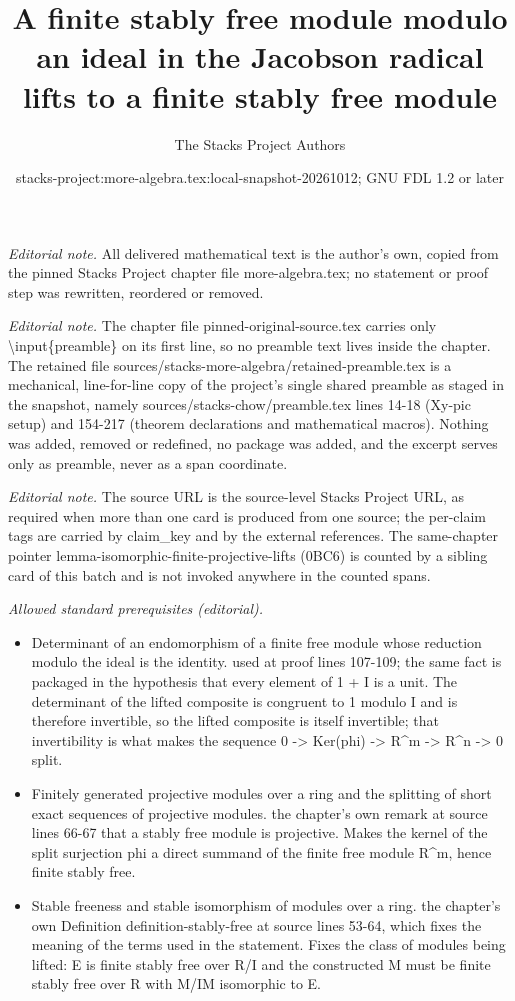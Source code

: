 \documentclass[10pt,a4paper]{amsart}
\title{A finite stably free module modulo an ideal in the Jacobson radical lifts to a finite stably free module}
\author{The Stacks Project Authors}
\date{stacks-project:more-algebra.tex:local-snapshot-20261012; GNU FDL 1.2 or later}
\theoremstyle{plain}
\theoremstyle{definition}
\theoremstyle{remark}
\numberwithin{equation}{subsection}
\begin{document}
\maketitle
\setcounter{subsection}{1}
\noindent\textit{Editorial note.} All delivered mathematical text is the author's own, copied from the pinned Stacks Project chapter file more-algebra.tex; no statement or proof step was rewritten, reordered or removed.\par\medskip
\noindent\textit{Editorial note.} The chapter file pinned-original-source.tex carries only \textbackslash{}input\{preamble\} on its first line, so no preamble text lives inside the chapter. The retained file sources/stacks-more-algebra/retained-preamble.tex is a mechanical, line-for-line copy of the project's single shared preamble as staged in the snapshot, namely sources/stacks-chow/preamble.tex lines 14-18 (Xy-pic setup) and 154-217 (theorem declarations and mathematical macros). Nothing was added, removed or redefined, no package was added, and the excerpt serves only as preamble, never as a span coordinate.\par\medskip
\noindent\textit{Editorial note.} The source URL is the source-level Stacks Project URL, as required when more than one card is produced from one source; the per-claim tags are carried by claim\_key and by the external references. The same-chapter pointer lemma-isomorphic-finite-projective-lifts (0BC6) is counted by a sibling card of this batch and is not invoked anywhere in the counted spans.\par\medskip
\noindent\textit{Allowed standard prerequisites (editorial).}\begin{itemize}
\item Determinant of an endomorphism of a finite free module whose reduction modulo the ideal is the identity. used at proof lines 107-109; the same fact is packaged in the hypothesis that every element of 1 + I is a unit. The determinant of the lifted composite is congruent to 1 modulo I and is therefore invertible, so the lifted composite is itself invertible; that invertibility is what makes the sequence 0 -> Ker(phi) -> R\textasciicircum{}m -> R\textasciicircum{}n -> 0 split.
\item Finitely generated projective modules over a ring and the splitting of short exact sequences of projective modules. the chapter's own remark at source lines 66-67 that a stably free module is projective. Makes the kernel of the split surjection phi a direct summand of the finite free module R\textasciicircum{}m, hence finite stably free.
\item Stable freeness and stable isomorphism of modules over a ring. the chapter's own Definition definition-stably-free at source lines 53-64, which fixes the meaning of the terms used in the statement. Fixes the class of modules being lifted: E is finite stably free over R/I and the constructed M must be finite stably free over R with M/IM isomorphic to E.
\end{itemize}\medskip
\end{document}
